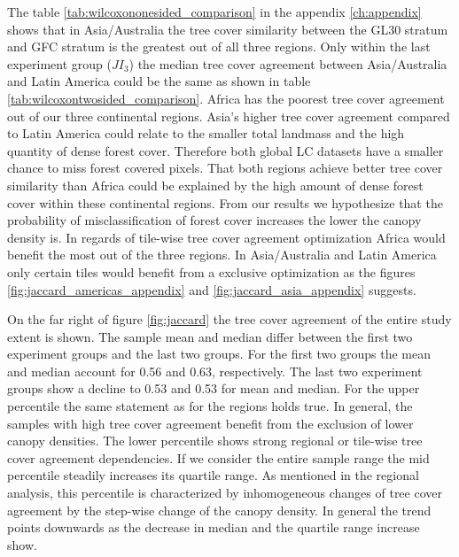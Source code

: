 			The table \ref{tab:wilcoxononesided_comparison} in the appendix \ref{ch:appendix} shows that in Asia/Australia the tree cover similarity between the \ac{GL30} stratum and \ac{GFC} stratum is the greatest out of all three regions. Only within the last experiment group ($JI_3$) the median tree cover agreement between Asia/Australia and Latin America could be the same as shown in table \ref{tab:wilcoxontwosided_comparison}. Africa has the poorest tree cover agreement out of our three continental regions. Asia's higher tree cover agreement compared to Latin America could relate to the smaller total landmass and the high quantity of dense forest cover. Therefore both global \ac{LC} datasets have a smaller chance to miss forest covered pixels. That both regions achieve better tree cover similarity than Africa could be explained by the high amount of dense forest cover within these continental regions. From our results we hypothesize that the probability of misclassification of forest cover increases the lower the canopy density is. In regards of tile-wise tree cover agreement optimization Africa would  benefit the most out of the three regions. In Asia/Australia and Latin America only certain tiles would benefit from a exclusive optimization as the figures \ref{fig:jaccard_americas_appendix} and \ref{fig:jaccard_asia_appendix} suggests.

			On the far right of figure \ref{fig:jaccard} the tree cover agreement of the entire study extent is shown. The sample mean and median differ between the first two experiment groups and the last two groups. For the first two groups the mean and median account for 0.56 and 0.63, respectively. The last two experiment groups show a decline to 0.53 and 0.53 for mean and median. For the upper percentile the same statement as for the regions holds true. In general, the samples with high tree cover agreement benefit from the exclusion of lower canopy densities. The lower percentile shows strong regional or tile-wise tree cover agreement dependencies. If we consider the entire sample range the mid percentile steadily increases its quartile range. As mentioned in the regional analysis, this percentile is characterized by inhomogeneous changes of tree cover agreement by the step-wise change of the canopy density. In general the trend points downwards as the decrease in median and the quartile range increase show. 

